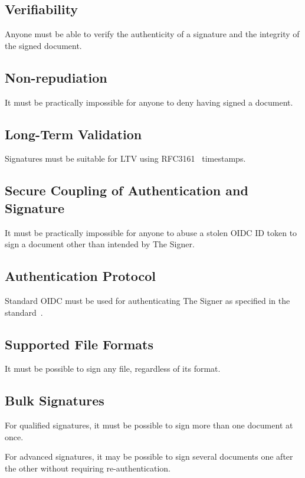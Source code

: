 \subsection{Verifiability}\label{subsec:verifiability}
Anyone must be able to verify the authenticity of a signature and the integrity of the signed document.

\subsection{Non-repudiation}\label{subsec:non-repudiation}
It must be practically impossible for anyone to deny having signed a document.

\subsection{Long-Term Validation}\label{subsec:req-long-term-validation}
Signatures must be suitable for \gls{LTV} using RFC3161~\cite{rfc3161} timestamps.

\subsection{Secure Coupling of Authentication and Signature}\label{subsec:secure-coupling-of-authentication-and-signature}
It must be practically impossible for anyone to abuse a stolen \gls{OIDC} ID token to sign a document other than intended by The Signer.

\subsection{Authentication Protocol}\label{subsec:authentication-protocol}
Standard \gls{OIDC} must be used for authenticating The Signer as specified in the standard~\cite{oidc}.

\subsection{Supported File Formats}\label{subsec:supported-file-formats}
It must be possible to sign any file, regardless of its format.

\subsection{Bulk Signatures}\label{subsec:bulk-signatures}
For qualified signatures, it must be possible to sign more than one document at once.

For advanced signatures, it may be possible to sign several documents one after the other without requiring re-authentication.

